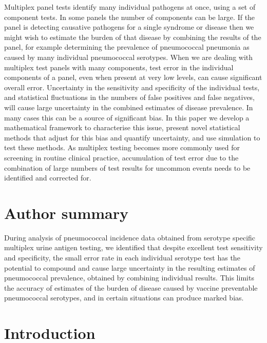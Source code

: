 \documentclass[10pt,letterpaper]{article}
\begin{document}
Multiplex panel tests identify many individual pathogens at once, using a set of component tests. In some panels the number of components can be large. If the panel is detecting causative pathogens for a single syndrome or disease then we might wish to estimate the burden of that disease by combining the results of the panel, for example determining the prevalence of pneumococcal pneumonia as caused by many individual pneumococcal serotypes. When we are dealing with multiplex test panels with many components, test error in the individual components of a panel, even when present at very low levels, can cause significant overall error. Uncertainty in the sensitivity and specificity of the individual tests, and statistical fluctuations in the numbers of false positives and false negatives, will cause large uncertainty in the combined estimates of disease prevalence. In many cases this can be a source of significant bias. In this paper we develop a mathematical framework to characterise this issue, present novel statistical methods that adjust for this bias and quantify uncertainty, and use simulation to test these methods. As multiplex testing becomes more commonly used for screening in routine clinical practice, accumulation of test error due to  the combination of large numbers of test results for uncommon events needs to be identified and corrected for. 


\section*{Author summary}

During analysis of pneumococcal incidence data obtained from serotype specific multiplex urine antigen testing, we identified that despite excellent test sensitivity and specificity, the small error rate in each individual serotype test has the potential to compound and cause large uncertainty in the resulting estimates of pneumococcal prevalence, obtained by combining individual results. This limits the accuracy of estimates of the burden of disease caused by vaccine preventable pneumococcal serotypes, and in certain situations can produce marked bias.

\linenumbers

\section*{Introduction}
\end{document}
